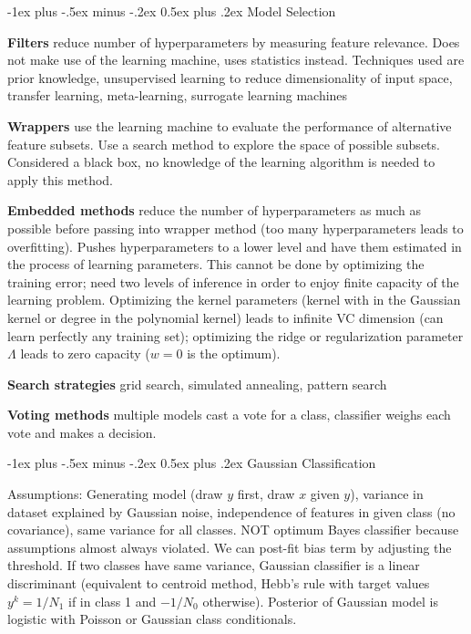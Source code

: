 \documentclass[9pt,landscape]{extarticle}
\makeatletter
\renewcommand{\section}{\@startsection{section}{1}{0mm}%
                                {-1ex plus -.5ex minus -.2ex}%
                                {0.5ex plus .2ex}%
                                {\normalfont\normalsize\bfseries}}
\makeatother
\begin{document}
\begin{multicols}{3}

\section{Model Selection}

\textbf{Filters} reduce number of hyperparameters by measuring feature relevance. Does not make use of the learning machine, uses statistics instead. Techniques used are prior knowledge, unsupervised learning to reduce dimensionality of input space, transfer learning, meta-learning, surrogate learning machines

\textbf{Wrappers} use the learning machine to evaluate the performance of alternative feature subsets. Use a search method to explore the space of possible subsets. Considered a black box, no knowledge of the learning algorithm is needed to apply this method.

\textbf{Embedded methods} reduce the number of hyperparameters as much as possible before passing into wrapper method (too many hyperparameters leads to overfitting). Pushes hyperparameters to a lower level and have them estimated in the process of learning parameters. This cannot be done by optimizing the training error; need two levels of inference in order to enjoy finite capacity of the learning problem. Optimizing the kernel parameters (kernel with in the Gaussian kernel or degree in the polynomial kernel) leads to infinite VC dimension (can learn perfectly any training set); optimizing the ridge or regularization parameter $\Lambda$ leads to zero capacity ($w=0$ is the optimum).

\textbf{Search strategies} grid search, simulated annealing, pattern search

\textbf{Voting methods} multiple models cast a vote for a class, classifier weighs each vote and makes a decision.


\section{Gaussian Classification}

Assumptions: Generating model (draw $y$ first, draw $x$ given $y$), variance in dataset explained by Gaussian noise, independence of features in given class (no covariance), same variance for all classes. NOT optimum Bayes classifier because assumptions almost always violated. We can post-fit bias term by adjusting the threshold. If two classes have same variance, Gaussian classifier is a linear discriminant (equivalent to centroid method, Hebb's rule with target values $y^k = 1/N_1$ if in class 1 and $-1/N_0$ otherwise). Posterior of Gaussian model is logistic with Poisson or Gaussian class conditionals.


\end{multicols}
\end{document}
